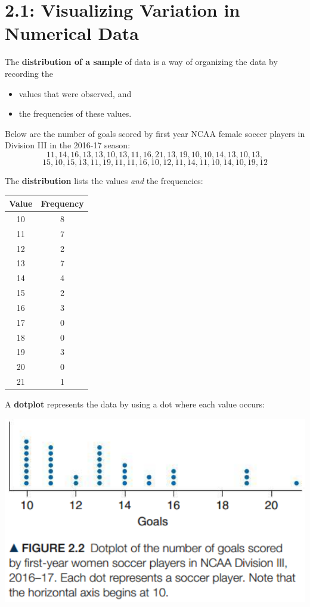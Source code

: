 \documentclass[../mathNotesPreamble]{subfiles}
\begin{document}
  \section{2.1: Visualizing Variation in Numerical Data}
  \begin{defn*}
    The \textbf{distribution of a sample} of data is a way of organizing the data by recording the
    \begin{itemize}
      \item values that were observed, and
      \item the frequencies of these values.
    \end{itemize}
  \end{defn*}
  
  \begin{ex*}
    Below are the number of goals scored by first year NCAA female soccer players in Division III in the 2016-17 season:
    \[11, 14, 16, 13, 13, 10, 13, 11, 16, 21, 13, 19, 10, 10, 14, 13, 10, 13, \]
    \[15, 10, 15, 13, 11, 19, 11, 11, 16, 10, 12, 11, 14, 11, 10, 14, 10, 19, 12\]
  \end{ex*}
  \noindent
  The \textbf{distribution} lists the values \emph{and} the frequencies:
  \begin{flushright}
    \begin{tabular}{@{}cc@{}}\toprule
      Value & Frequency \\\midrule
      10 & 8 \\
      11 & 7 \\
      12 & 2 \\
      13 & 7 \\
      14 & 4 \\
      15 & 2 \\
      16 & 3 \\
      17 & 0 \\
      18 & 0 \\
      19 & 3 \\
      20 & 0 \\
      21 & 1 \\\bottomrule
    \end{tabular}
  \end{flushright}
  \pagebreak

  \noindent
  A \textbf{dotplot} represents the data by using a dot where each value occurs:
  \begin{center}
    \includegraphics[width=0.5\linewidth]{images/math211_figure_2p02}
  \end{center}
  
\end{document}

